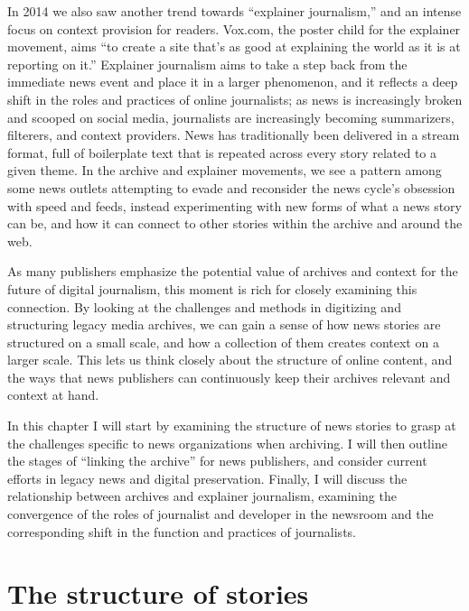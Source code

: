 In 2014 we also saw another trend towards ``explainer journalism,'' and an intense focus on context provision for readers. Vox.com, the poster child for the explainer movement, aims ``to create a site that's as good at explaining the world as it is at reporting on it.''\autocite{klein_vox_2014} Explainer journalism aims to take a step back from the immediate news event and place it in a larger phenomenon, and it reflects a deep shift in the roles and practices of online journalists; as news is increasingly broken and scooped on social media, journalists are increasingly becoming summarizers, filterers, and context providers. News has traditionally been delivered in a stream format, full of boilerplate text that is repeated across every story related to a given theme. In the archive and explainer movements, we see a pattern among some news outlets attempting to evade and reconsider the news cycle's obsession with speed and feeds, instead experimenting with new forms of what a news story can be, and how it can connect to other stories within the archive and around the web.

As many publishers emphasize the potential value of archives and context for the future of digital journalism, this moment is rich for closely examining this connection. By looking at the challenges and methods in digitizing and structuring legacy media archives, we can gain a sense of how news stories are structured on a small scale, and how a collection of them creates context on a larger scale. This lets us think closely about the structure of online content, and the ways that news publishers can continuously keep their archives relevant and context at hand.

In this chapter I will start by examining the structure of news stories to grasp at the challenges specific to news organizations when archiving. I will then outline the stages of ``linking the archive'' for news publishers, and consider current efforts in legacy news and digital preservation. Finally, I will discuss the relationship between archives and explainer journalism, examining the convergence of the roles of journalist and developer in the newsroom and the corresponding shift in the function and practices of journalists.

\section{The structure of stories}


